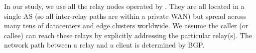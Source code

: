 In our study, we use all the relay nodes operated by \skype. They are all located in a single AS (so all inter-relay paths are within a private WAN) but spread across many tens of datacenters and edge clusters worldwide. 
We assume the caller (or callee) can reach these relays %
by explicitly addressing the particular relay(s). %
The network path between a relay and a client is determined by BGP. 




